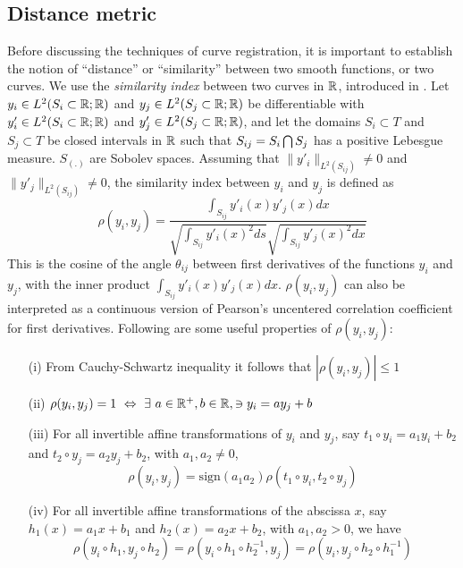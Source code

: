 \subsection{Distance metric}
Before discussing the techniques of curve registration, it is important to establish the notion of ``distance'' or ``similarity'' between two smooth functions, or two curves. We use the {\emph{similarity index}} between two curves in $\mathbb{R}$, introduced in \cite{Sangalli_etal_2009_JASA}. Let $y_i \in L^2(S_i \subset \mathbb{R}; \mathbb{R})$ and $y_j \in L^2(S_j \subset \mathbb{R}; \mathbb{R})$ be differentiable with $y'_i \in L^2(S_i \subset \mathbb{R}; \mathbb{R})$ and $y'_j \in L^2(S_j \subset \mathbb{R}; \mathbb{R})$, and let the domains $S_i \subset T$ and $S_j  \subset T$ be closed intervals in $\mathbb{R}$ such that $S_{ij} = S_i \bigcap S_j$ has a positive Lebesgue measure. $S_{(.)}$ are Sobolev spaces. Assuming that $\|y'_i\|_{L^2(S_{ij})} \ne 0$ and $\|y'_j\|_{L^2(S_{ij})} \ne 0$, the similarity index between $y_i$ and $y_j$ is defined as
\begin{equation}
\rho(y_i, y_j) = \frac{\int _{S_{ij}}y'_i(x)y'_j(x) dx}{\sqrt{\int _{S_{ij}}y'_i(x)^2 ds}\sqrt{ \int _{S_{ij}} y'_j(x)^2 dx}}
\label{eq:3_similarity}
\end{equation}
This is the cosine of the angle $\theta_{ij}$ between first derivatives of the functions $y_i$ and $y_j$, with the inner product $\int _{S_{ij}}y'_i(x)y'_j(x) dx$.  $\rho(y_i, y_j)$ can also be interpreted as a continuous version of Pearson’s uncentered correlation coefficient for first derivatives. Following are some useful properties of $\rho(y_i, y_j)$:
\begin{enumerate}
\item[(i)] From Cauchy-Schwartz inequality it follows that $|\rho(y_i, y_j)| \leq 1$
\item[(ii)] $\rho(y_i, y_j) = 1 \ \Leftrightarrow \ \exists \ a \in \mathbb{R}^{+}, b \in \mathbb{R}, \ni y_i = ay_j + b $
\item[(iii)] For all invertible affine transformations of $y_i$ and $y_j$, say $t_1 \circ y_i = a_1y_i + b_2$ and $t_2 \circ y_j = a_2y_j + b_2$, with $a_1, a_2 \ne 0$, 
\[ \rho(y_i, y_j) = \text{sign}(a_1 a_2)\rho(t_1 \circ y_i, t_2 \circ y_j)\]
\item[(iv)] For all invertible affine transformations of the abscissa $x$, say $h_1(x) = a_1 x + b_1$ and $h_2(x) = a_2 x + b_2$, with $a_1, a_2 > 0$, we have
\[ \rho(y_i \circ h_1, y_j \circ h_2) = \rho(y_i \circ h_1 \circ h_2^{-1}, y_j) = \rho(y_i , y_j \circ h_2 \circ h_1^{-1}) \]
\end{enumerate}

